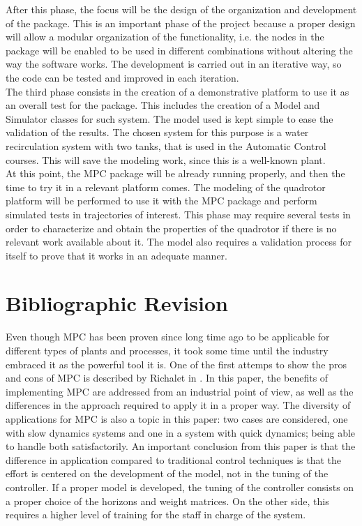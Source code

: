After this phase, the focus will be the design of the organization and development of the package. This is an important phase of the project because a proper design will allow a modular organization of the functionality, i.e. the nodes in the package will be enabled to be used in different combinations without altering the way the software works. The development is carried out in an iterative way, so the code can be tested and improved in each iteration. \\

The third phase consists in the creation of a demonstrative platform to use it as an overall test for the package. This includes the creation of a Model and Simulator classes for such system. The model used is kept simple to ease the validation of the results. The chosen system for this purpose is a water recirculation system with two tanks, that is used in the Automatic Control courses. This will save the modeling work, since this is a well-known plant. \\

At this point, the MPC package will be already running properly, and then the time to try it in a relevant platform comes. The modeling of the quadrotor platform will be performed to use it with the MPC package and perform simulated tests in trajectories of interest. This phase may require several tests in order to characterize and obtain the properties of the quadrotor if there is no relevant work available about it. The model also requires a validation process for itself to prove that it works in an adequate manner. 

\section{Bibliographic Revision}

Even though MPC has been proven since long time ago to be applicable for different types of plants and processes, it took some time until the industry embraced it as the powerful tool it is. One of the first attemps to show the pros and cons of MPC is described  by Richalet in \cite{Richalet1993}. In this paper, the benefits of implementing MPC are addressed from an industrial point of view, as well as the differences in the approach required to apply it in a proper way. The diversity of applications for MPC is also a topic in this paper: two cases are considered, one with slow dynamics systems and one in a system with quick dynamics; being able to handle both satisfactorily. An important conclusion from this paper is that the difference in application compared to traditional control techniques is that the effort is centered on the development of the model, not in the tuning of the controller. If a proper model is developed, the tuning of the controller consists on a proper choice of the horizons and weight matrices. On the other side, this requires a higher level of training for the staff in charge of the system.\\

